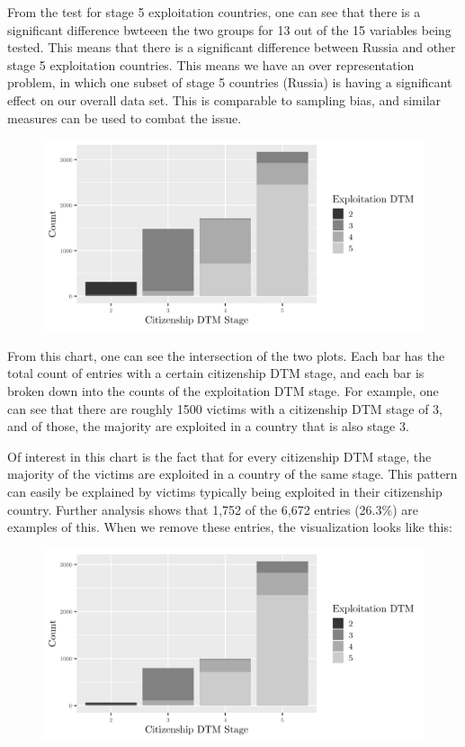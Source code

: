 \documentclass{article} %
\begin{document}
From the test for stage 5 exploitation countries, one can see that there is a significant difference bwteeen the two groups for 13 out of the 15 variables being tested. This means that there is a significant difference between Russia and other stage 5 exploitation countries. This means we have an over representation problem, in which one subset of stage 5 countries (Russia) is having a significant effect on our overall data set. This is comparable to sampling bias, and similar measures can be used to combat the issue.


\FloatBarrier
\begin{figure}[H]
	\includegraphics[width = \textwidth]{DTMStage1}
\end{figure}
\FloatBarrier

From this chart, one can see the intersection of the two plots. Each bar has the total count of entries with a certain citizenship DTM stage, and each bar is broken down into the counts of the exploitation DTM stage. For example, one can see that there are roughly 1500 victims with a citizenship DTM stage of 3, and of those, the majority are exploited in a country that is also stage 3.

Of interest in this chart is the fact that for every citizenship DTM stage, the majority of the victims are exploited in a country of the same stage. This pattern can easily be explained by victims typically being exploited in their citizenship country. Further analysis shows that 1,752 of the 6,672 entries (26.3\%) are examples of this. When we remove these entries, the visualization looks like this:

\FloatBarrier
\begin{figure}[H]
	\includegraphics[width = \textwidth]{Different_CountryDTM}
\end{figure}
\FloatBarrier
\end{document}
